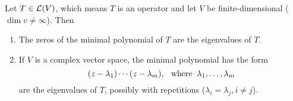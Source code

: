 \setcounter{thm}{26}
\begin{thm} 
  \label{thm: eigenvalues are the zeros of the minimal polynomial}
  Let $T \in \mathcal{L}(V)$, which means $T$ is an operator and let $V$ be finite-dimensional ($\dim v \neq \infty$). Then
  \begin{enumerate}[label=\textbf{(\alph*)}]
    \item The zeros of the minimal polynomial of $T$ are the eigenvalues of $T$.
    \item If $V$ is a complex vector space, the minimal polynomial has the form
    \begin{equation}
      (z-\lambda_1)\cdots(z-\lambda_m), \;\;\, \text{where}\;\; \lambda_1, \dots, \lambda_m
    \end{equation} are the eigenvalues of $T$, possibly with repetitions ($\lambda_i = \lambda_j, i \neq j$).
  \end{enumerate}
\end{thm}
